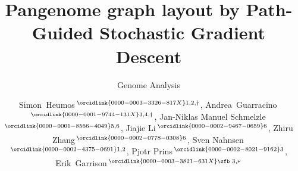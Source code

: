\documentclass{bioinfo}
\theoremstyle{definition}
\begin{document}

    \subtitle{Genome Analysis}

    \title[Pangenome graph layout by Path-Guided Stochastic Gradient Descent]{Pangenome graph layout by Path-Guided Stochastic Gradient Descent}
    
	\author[Heumos, Guarracino \textit{et~al}.]{
        Simon~Heumos\,$^{\orcidlink{0000-0003-3326-817X}1,2,\dagger}$,
        Andrea~Guarracino\,$^{\orcidlink{0000-0001-9744-131X}3,4,\dagger}$,
        Jan-Niklas Manuel Schmelzle\,$^{\orcidlink{0000-0001-8566-4049}5,6}$,
        Jiajie Li\,$^{\orcidlink{0000-0002-9467-0659}6}$,
        Zhiru Zhang\,$^{\orcidlink{0000-0002-0778-0308}6}$,
        Sven Nahnsen\,$^{\orcidlink{0000-0002-4375-0691}1,2}$,
        Pjotr Prins\,$^{\orcidlink{0000-0002-8021-9162}3}$,
        Erik~Garrison\,$^{\orcidlink{0000-0003-3821-631X}\text{\sfb 3},*}$
    }

    \address{
        $^1$Quantitative Biology Center (QBiC), University of Tübingen, Tübingen 72076, Germany \\
        $^2$Biomedical Data Science, Department of Computer Science, University of Tübingen, Tübingen 72076, Germany \\
        $^3$Department of Genetics, Genomics and Informatics, University of Tennessee Health Science Center, Memphis, TN 38163, USA \\
        $^4$Genomics Research Centre, Human Technopole, Milan 20157, Italy \\
        $^5$Department of Computer Engineering, School of Computation, Information and Technology (CIT), Technical University of Munich, Munich 80333, Germany \\
        $^6$School of Electrical and Computer Engineering, Cornell University, Ithaca, NY 14853, USA \\
    }
\end{document}
